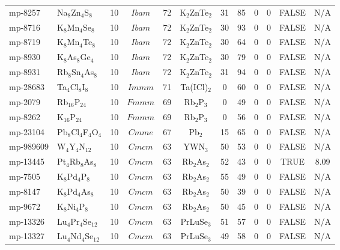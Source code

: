 {\begin{longtable}{llcccccccccc}
    mp-8257 & Na$_{8}$Zn$_{4}$S$_{8}$ & 10    & $Ibam$ & 72    & K$_{2}$ZnTe$_{2}$ & 31    & 85    & 0     & 0     & FALSE & N/A \\
    mp-8716 & K$_{8}$Mn$_{4}$Se$_{8}$ & 10    & $Ibam$ & 72    & K$_{2}$ZnTe$_{2}$ & 30    & 93    & 0     & 0     & FALSE & N/A \\
    mp-8719 & K$_{8}$Mn$_{4}$Te$_{8}$ & 10    & $Ibam$ & 72    & K$_{2}$ZnTe$_{2}$ & 30    & 64    & 0     & 0     & FALSE & N/A \\
    mp-8930 & K$_{8}$As$_{8}$Ge$_{4}$ & 10    & $Ibam$ & 72    & K$_{2}$ZnTe$_{2}$ & 30    & 79    & 0     & 0     & FALSE & N/A \\
    mp-8931 & Rb$_{8}$Sn$_{4}$As$_{8}$ & 10    & $Ibam$ & 72    & K$_{2}$ZnTe$_{2}$ & 31    & 94    & 0     & 0     & FALSE & N/A \\
    mp-28683 & Ta$_{4}$Cl$_{8}$I$_{8}$ & 10    & $Immm$ & 71    & Ta(ICl)$_{2}$ & 0     & 60    & 0     & 0     & FALSE & N/A \\
    mp-2079 & Rb$_{16}$P$_{24}$ & 10    & $Fmmm$ & 69    & Rb$_{2}$P$_{3}$ & 0     & 49    & 0     & 0     & FALSE & N/A \\
    mp-8262 & K$_{16}$P$_{24}$ & 10    & $Fmmm$ & 69    & Rb$_{2}$P$_{3}$ & 0     & 56    & 0     & 0     & FALSE & N/A \\
    mp-23104 & Pb$_{8}$Cl$_{4}$F$_{4}$O$_{4}$ & 10    & $Cmme$ & 67    & Pb$_{2}$ & 15    & 65    & 0     & 0     & FALSE & N/A \\
    mp-989609 & W$_{4}$Y$_{4}$N$_{12}$ & 10    & $Cmcm$ & 63    & YWN$_{3}$ & 50    & 53    & 0     & 0     & FALSE & N/A \\
    mp-13445 & Pt$_{4}$Rb$_{8}$As$_{8}$ & 10    & $Cmcm$ & 63    & Rb$_{2}$As$_{2}$ & 52    & 43    & 0     & 0     & TRUE  & 8.09  \\
    mp-7505 & K$_{8}$Pd$_{4}$P$_{8}$ & 10    & $Cmcm$ & 63    & Rb$_{2}$As$_{2}$ & 55    & 49    & 0     & 0     & FALSE & N/A \\
    mp-8147 & K$_{8}$Pd$_{4}$As$_{8}$ & 10    & $Cmcm$ & 63    & Rb$_{2}$As$_{2}$ & 50    & 39    & 0     & 0     & FALSE & N/A \\
    mp-9672 & K$_{8}$Ni$_{4}$P$_{8}$ & 10    & $Cmcm$ & 63    & Rb$_{2}$As$_{2}$ & 50    & 45    & 0     & 0     & FALSE & N/A \\
    mp-13326 & Lu$_{4}$Pr$_{4}$Se$_{12}$ & 10    & $Cmcm$ & 63    & PrLuSe$_{3}$ & 51    & 57    & 0     & 0     & FALSE & N/A \\
    mp-13327 & Lu$_{4}$Nd$_{4}$Se$_{12}$ & 10    & $Cmcm$ & 63    & PrLuSe$_{3}$ & 49    & 58    & 0     & 0     & FALSE & N/A \\

\end{longtable}}
